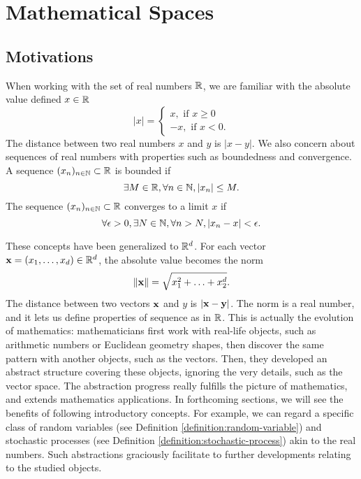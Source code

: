 \section{Mathematical Spaces}
\subsection{Motivations}

When working with the set of real numbers $\mathbb{R}$, we are familiar with the absolute value defined $x\in\mathbb{R}$
\begin{equation}
 \label{equation:number-absolute-value}
 |x| = \begin{cases}
  x, \text{ if } x\ge0 \\
  -x, \text{ if } x < 0.
 \end{cases}
\end{equation}
The distance between two real numbers $x$ and $y$ is $|x-y|$. We also concern about sequences of real numbers with properties such as boundedness and convergence. A sequence $(x_n)_{n\in\mathbb{N}}\subset\mathbb{R}$ is bounded if
$$\exists M\in\mathbb{R}, \forall n\in \mathbb{N}, |x_n|\le M.$$
The sequence $(x_n)_{n\in\mathbb{N}}\subset\mathbb{R}$ converges to a limit $x$ if
$$\forall \epsilon > 0, \exists N\in\mathbb{N}, \forall n>N, |x_n-x|<\epsilon.$$

These concepts have been generalized to $\mathbb{R}^d$. For each vector $\mathbf{x}=(x_1,\ldots,x_d)\in\mathbb{R}^d$, the absolute value becomes the norm
\begin{equation}
 \label{equation:vector-norm}
 \|\mathbf{x}\| = \sqrt{x_1^2+\ldots+x_2^d}.
\end{equation}
The distance between two vectors $\mathbf{x}$ and $y$ is $|\mathbf{x}-\mathbf{y}|$. The norm is a real number, and it lets us define properties of sequence as in $\mathbb{R}$. This is actually the evolution of mathematics: mathematicians first work with real-life objects, such as arithmetic numbers or Euclidean geometry shapes, then discover the same pattern with another objects, such as the vectors. Then, they developed an abstract structure covering these objects, ignoring the very details, such as the vector space. The abstraction progress really fulfills the picture of mathematics, and extends mathematics applications. In forthcoming sections, we will see the benefits of following introductory concepts. For example, we can regard a specific class of random variables (see Definition \ref{definition:random-variable}) and stochastic processes (see Definition \ref{definition:stochastic-process}) akin to the real numbers. Such abstractions graciously facilitate to further developments relating to the studied objects.

